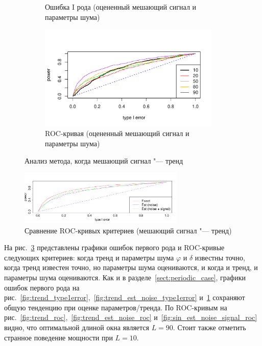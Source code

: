 \documentclass[specialist,
substylefile = spbu_report.rtx,
subf,href,colorlinks=true, 12pt]{disser}
\theoremstyle{definition}
\begin{document}
\begin{figure}[h!]
\begin{subfigure}[t]{0.5\textwidth}
		\caption{Ошибка I рода (оцененный мешающий сигнал и параметры шума)}
		\label{fig:trend_est_noise_signal_type1error}
	\end{subfigure}\hspace{\fill}
	\begin{subfigure}[t]{0.5\textwidth}
		\centering
		\includegraphics[width=0.95\textwidth]{img/roc_sin_est_noise_signal.pdf}
		\caption{ROC-кривая (оцененный мешающий сигнал и параметры шума)}
		\label{fig:trend_est_noise_signal_roc}
	\end{subfigure}
	\caption{Анализ метода, когда мешающий сигнал "--- тренд}
\label{fig:trend}
\end{figure}

\begin{figure}[h!]
	\centering
	\includegraphics[width=0.7\textwidth]{img/roc_trend_copm.pdf}
	\caption{Сравнение ROC-кривых критериев (мешающий сигнал "--- тренд)}
	\label{fig:power_comp_trend}
\end{figure}

На рис.~\ref{fig:trend} представлены графики ошибок первого рода и ROC-кривые следующих критериев: когда тренд и параметры шума $\varphi$ и $\delta$ известны точно, когда тренд известен точно, но параметры шума оцениваются, и когда и тренд, и параметры шума оцениваются. Как и в разделе~\ref{sect:periodic_case}, графики ошибок первого рода на рис.~\ref{fig:trend_type1error},~\ref{fig:trend_est_noise_type1error} и~\ref{fig:trend_est_noise_signal_type1error} сохраняют общую тенденцию при оценке параметров/тренда. По ROC-кривым на рис.~\ref{fig:trend_roc},~\ref{fig:trend_est_noise_roc} и~\ref{fig:sin_est_noise_signal_roc} видно, что оптимальной длиной окна является $L=90$. Стоит также отметить странное поведение мощности при $L=10$.
\end{document}
